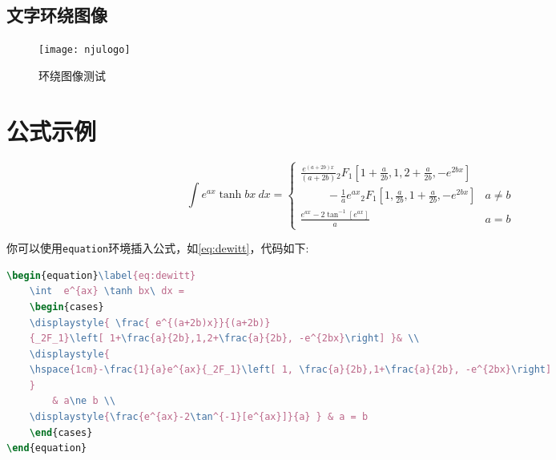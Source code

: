 \documentclass[
    TitleLength=1,%
    Degree=UG,%
    Type=thesis%
]{njuthesis}
\begin{document}
\subsection{文字环绕图像}
\begin{wrapfigure}{r}{0cm}
    \texttt{[image: njulogo]}
    \caption{环绕图像测试}
\end{wrapfigure}
\zhlipsum[3][name=xiangyu]

\section{公式示例}
\begin{equation}\label{eq:dewitt}
    \int  e^{ax} \tanh bx\ dx = 
    \begin{cases}
    \displaystyle{ \frac{ e^{(a+2b)x}}{(a+2b)} 
    {_2F_1}\left[ 1+\frac{a}{2b},1,2+\frac{a}{2b}, -e^{2bx}\right] }& \\
    \displaystyle{
    \hspace{1cm}-\frac{1}{a}e^{ax}{_2F_1}\left[ 1, \frac{a}{2b},1+\frac{a}{2b}, -e^{2bx}\right]
    }
     & a\ne b \\
    \displaystyle{\frac{e^{ax}-2\tan^{-1}[e^{ax}]}{a} } & a = b
    \end{cases}
\end{equation}
    
你可以使用\lstinline|equation|环境插入公式，如\cref{eq:dewitt}，代码如下:
\begin{lstlisting}[language=TeX]
\begin{equation}\label{eq:dewitt}
    \int  e^{ax} \tanh bx\ dx = 
    \begin{cases}
    \displaystyle{ \frac{ e^{(a+2b)x}}{(a+2b)} 
    {_2F_1}\left[ 1+\frac{a}{2b},1,2+\frac{a}{2b}, -e^{2bx}\right] }& \\
    \displaystyle{
    \hspace{1cm}-\frac{1}{a}e^{ax}{_2F_1}\left[ 1, \frac{a}{2b},1+\frac{a}{2b}, -e^{2bx}\right]
    }
        & a\ne b \\
    \displaystyle{\frac{e^{ax}-2\tan^{-1}[e^{ax}]}{a} } & a = b
    \end{cases}
\end{equation}
\end{lstlisting}

\end{document}
